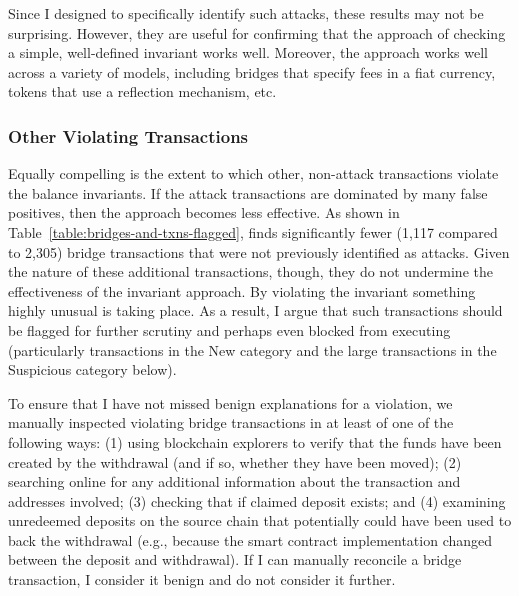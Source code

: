 Since I designed \offlinetool to specifically identify such attacks,
these results may not be surprising.  However, they are useful for
confirming that the approach of checking a simple, well-defined
invariant works well.  Moreover, the approach works well across a
variety of models, including bridges that specify fees in a fiat
currency, tokens that use a reflection mechanism, etc.


\subsubsection{Other Violating Transactions}


Equally compelling
is the extent to which other, non-attack
transactions violate the balance invariants.  If the
attack transactions are dominated by many false positives, then the
approach becomes less effective.
%
As shown in Table~\ref{table:bridges-and-txns-flagged}, \offlinetool
finds significantly fewer (1,117 compared to 2,305) bridge transactions that were
not previously identified as attacks.  Given the nature of these
additional transactions, though, they do not undermine the
effectiveness of the invariant approach.  By violating the invariant
something highly unusual is taking place.  As a result, I argue that
such transactions should be flagged for further scrutiny and perhaps
even blocked from executing (particularly transactions in the New category and the large transactions in
the Suspicious category below).

To ensure that I have not missed benign explanations for a violation,
we manually inspected violating bridge transactions in at least of one
of the following ways: (1) using blockchain explorers to verify that
the funds have been created by the withdrawal (and if so, whether they
have been moved); (2) searching online for any additional information
about the transaction and addresses involved; (3) checking that if
claimed deposit exists; and (4) examining unredeemed
deposits on the source chain that potentially could have been used to
back the withdrawal (e.g., because the smart contract implementation
changed between the deposit and withdrawal).  If I can manually
reconcile a bridge transaction, I consider it benign
and do not consider it further.

